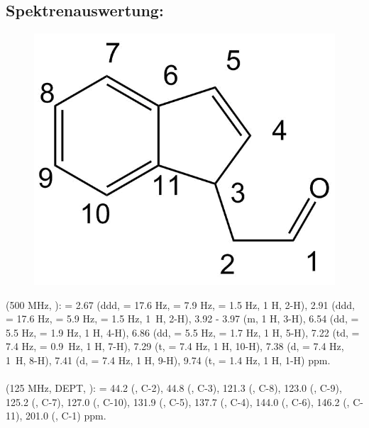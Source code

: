 \documentclass[12pt]{article}
\begin{document}
\begin{onehalfspace}
\section{Spektrenauswertung:}
\begin{figure}[!htbp]
   \centering
\includegraphics[scale=0.3]{auswert.png}
\end{figure}
\noindent
\textbf{} (500 MHz, ): \sffamily \ce{$\delta$} =
2.67 (ddd,  = 17.6 \si{\hertz},  = 7.9 \si{\hertz},  = 1.5 \si{\hertz}, 1 H, 2-H),
2.91 (ddd,  = 17.6 \si{\hertz},  = 5.9 \si{\hertz},  = 1.5 \si{\hertz}, 1~H, 2-H), 
3.92 - 3.97 (m, 1 H, 3-H),
6.54 (dd,  = 5.5 \si{\hertz},  = 1.9 \si{\hertz}, 1 H, 4-H), 
6.86 (dd,  = 5.5 \si{\hertz},  = 1.7 \si{\hertz}, 1 H, 5-H), 
7.22 (td,  = 7.4 \si{\hertz},  = 0.9~\si{\hertz}, 1 H, 7-H),
7.29 (t,  = 7.4 \si{\hertz}, 1 H, 10-H),
7.38 (d,  = 7.4 \si{\hertz}, 1~H, 8-H),
7.41 (d,  = 7.4 \si{\hertz}, 1 H, 9-H),
9.74 (t,  = 1.4 \si{\hertz}, 1 H, 1-H) ppm. \\\\
\noindent
\textbf{} (125 MHz, DEPT, ): \sffamily \ce{$\delta$} =
44.2  (, C-2),
44.8  (, C-3),
121.3 (, C-8),
123.0 (, C-9),
125.2 (, C-7),
127.0 (, C-10), 
131.9 (, C-5), 
137.7 (, C-4),
144.0 (, C-6),
146.2 (, C-11),
201.0 (, C-1) ppm. 

\end{onehalfspace}
\end{document}
